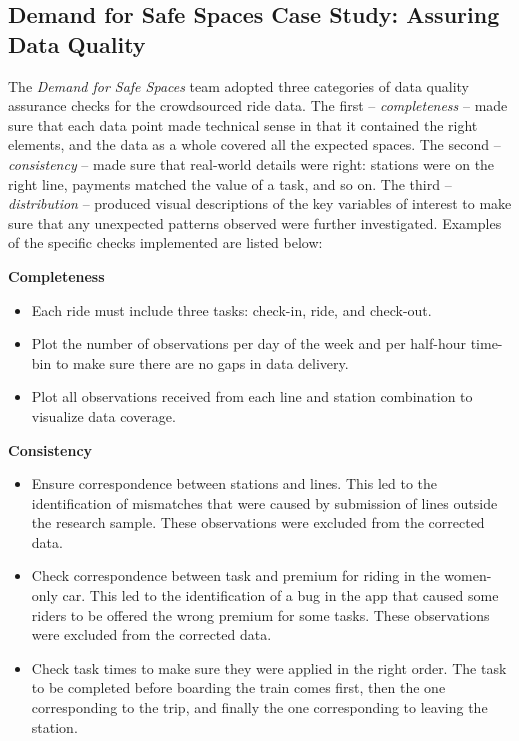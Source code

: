 \documentclass[
]{book}
\providecommand{\tightlist}{%
  \setlength{\itemsep}{0pt}\setlength{\parskip}{0pt}}
\begin{document}
\begin{ex}
\hypertarget{demand-for-safe-spaces-case-study-assuring-data-quality}{%
\subsection{Demand for Safe Spaces Case Study: Assuring Data Quality}\label{demand-for-safe-spaces-case-study-assuring-data-quality}}

The \emph{Demand for Safe Spaces} team adopted three categories of data quality assurance checks for the crowdsourced ride data. The first -- \emph{completeness} -- made sure that each data point made technical sense in that it contained the right elements, and the data as a whole covered all the expected spaces. The second -- \emph{consistency} -- made sure that real-world details were right: stations were on the right line, payments matched the value of a task, and so on. The third -- \emph{distribution} -- produced visual descriptions of the key variables of interest to make sure that any unexpected patterns observed were further investigated. Examples of the specific checks implemented are listed below:

\textbf{Completeness}

\begin{itemize}
\tightlist
\item
  Each ride must include three tasks: check-in, ride, and check-out.
\item
  Plot the number of observations per day of the week and per half-hour time-bin to make sure there are no gaps in data delivery.
\item
  Plot all observations received from each line and station combination to visualize data coverage.
\end{itemize}

\textbf{Consistency}

\begin{itemize}
\tightlist
\item
  Ensure correspondence between stations and lines. This led to the identification of mismatches that were caused by submission of lines outside the research sample. These observations were excluded from the corrected data.
\item
  Check correspondence between task and premium for riding in the women-only car. This led to the identification of a bug in the app that caused some riders to be offered the wrong premium for some tasks. These observations were excluded from the corrected data.
\item
  Check task times to make sure they were applied in the right order. The task to be completed before boarding the train comes first, then the one corresponding to the trip, and finally the one corresponding to leaving the station.
\end{itemize}


\end{ex}
\end{document}

